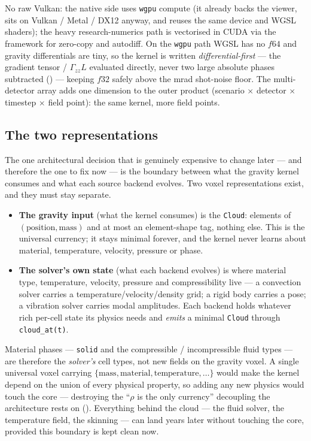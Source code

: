\documentclass[11pt,a4paper]{article}
\theoremstyle{reqstyle}
\begin{document}
No raw Vulkan: the native side uses \texttt{wgpu} compute (it already backs the viewer, sits
on Vulkan / Metal / DX12 anyway, and reuses the same device and WGSL shaders); the heavy
research-numerics path is vectorised in CUDA via the framework for zero-copy and autodiff. On
the \texttt{wgpu} path WGSL has no $f64$ and gravity differentials are tiny, so the kernel is
written \emph{differential-first} --- the gradient tensor / $\Gamma_{zz}L$ evaluated directly,
never two large absolute phases subtracted () --- keeping $f32$ safely above the
mrad shot-noise floor. The multi-detector array adds one dimension to the outer product
(scenario $\times$ detector $\times$ timestep $\times$ field point): the same kernel, more
field points.

\subsection{The two representations}
\label{sec:tworep}
The one architectural decision that is genuinely expensive to change later --- and therefore
the one to fix now --- is the boundary between what the gravity kernel consumes and what each
source backend evolves. Two voxel representations exist, and they must stay separate.

\begin{itemize}[leftmargin=*,nosep]
\item \textbf{The gravity input} (what the kernel consumes) is the \texttt{Cloud}: elements of
$(\text{position},\text{mass})$ and at most an element-shape tag, nothing else. This is the
universal currency; it stays minimal forever, and the kernel never learns about material,
temperature, velocity, pressure or phase.
\item \textbf{The solver's own state} (what each backend evolves) is where material type,
temperature, velocity, pressure and compressibility live --- a convection solver carries a
temperature/velocity/density grid; a rigid body carries a pose; a vibration solver carries
modal amplitudes. Each backend holds whatever rich per-cell state its physics needs and
\emph{emits} a minimal \texttt{Cloud} through \texttt{cloud\_at(t)}.
\end{itemize}

Material phases --- \texttt{solid} and the compressible / incompressible fluid types --- are
therefore the \emph{solver's} cell types, not new fields on the gravity voxel. A single
universal voxel carrying $\{\text{mass},\text{material},\text{temperature},\dots\}$ would make
the kernel depend on the union of every physical property, so adding any new physics would
touch the core --- destroying the ``$\rho$ is the only currency'' decoupling the architecture
rests on (). Everything behind the cloud --- the fluid solver, the
temperature field, the skinning --- can land years later without touching the core, provided
this boundary is kept clean now.
\end{document}
